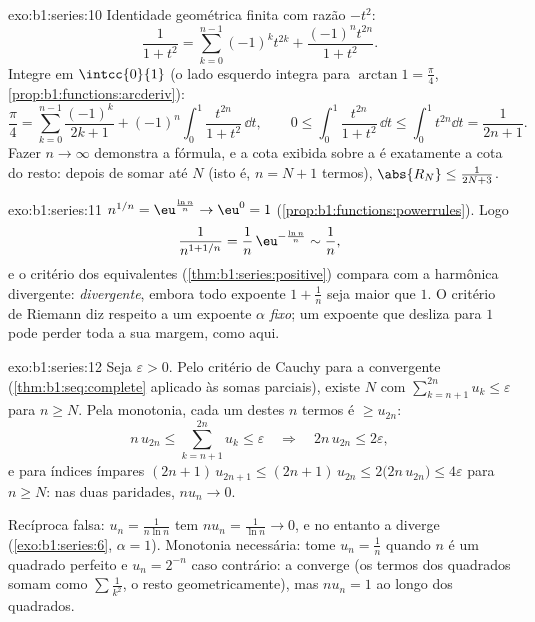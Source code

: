 \begin{solution}{exo:b1:series:10}
Identidade geométrica finita com razão $-t^2$:
\[
\frac{1}{1 + t^2} = \sum_{k=0}^{n-1} (-1)^k t^{2k}
+ \frac{(-1)^n t^{2n}}{1 + t^2} .
\]
Integre em $\intcc{0}{1}$ (o lado esquerdo integra para $\arctan
1 = \frac\pi4$, \cref{prop:b1:functions:arcderiv}):
\[
\frac{\pi}{4} = \sum_{k=0}^{n-1} \frac{(-1)^k}{2k+1}
+ (-1)^n \int_0^1 \frac{t^{2n}}{1+t^2}\,\dd t,
\qquad
0 \leq \int_0^1 \frac{t^{2n}}{1+t^2}\,\dd t \leq \int_0^1 t^{2n}\dd
t = \frac{1}{2n+1} .
\]
Fazer $n \to \infty$ demonstra a fórmula, e a cota exibida sobre a 
é exatamente a cota do resto: depois de somar até
$N$ (isto é, $n = N + 1$ termos), $\abs{R_N} \leq \frac{1}{2N + 3}$.
\end{solution}

\begin{solution}{exo:b1:series:11}
$n^{1/n} = \eu^{\frac{\ln n}{n}} \to \eu^0 = 1$
(\cref{prop:b1:functions:powerrules}). Logo
\[
\frac{1}{n^{1 + 1/n}} = \frac{1}{n}\,\eu^{-\frac{\ln n}{n}}
\sim \frac{1}{n} ,
\]
e o critério dos equivalentes (\cref{thm:b1:series:positive})
compara com a  harmônica divergente: \emph{divergente},
embora todo expoente $1 + \frac1n$ seja maior que $1$. O critério de
Riemann diz respeito a um expoente $\alpha$ \emph{fixo}; um expoente
que desliza para $1$ pode perder toda a sua margem, como aqui.
\end{solution}

\begin{solution}{exo:b1:series:12}
Seja $\varepsilon > 0$. Pelo critério de Cauchy para a
 convergente (\cref{thm:b1:seq:complete} aplicado às
somas parciais), existe $N$ com $\sum_{k=n+1}^{2n} u_k \leq
\varepsilon$ para $n \geq N$. Pela monotonia,
cada um destes $n$ termos é $\geq u_{2n}$:
\[
n\,u_{2n} \leq \sum_{k=n+1}^{2n} u_k \leq \varepsilon
\quad\Longrightarrow\quad 2n\,u_{2n} \leq 2\varepsilon ,
\]
e para índices ímpares $(2n+1)\,u_{2n+1} \leq (2n+1)\,u_{2n} \leq
2\bigl(2n\,u_{2n}\bigr) \leq 4\varepsilon$ para $n \geq N$: nas duas
paridades, $n u_n \to 0$.

Recíproca falsa: $u_n = \frac{1}{n\ln n}$ tem $n u_n =
\frac{1}{\ln n} \to 0$, e no entanto a  diverge
(\cref{exo:b1:series:6}, $\alpha = 1$). Monotonia necessária:
tome $u_n = \frac1n$ quando $n$ é um quadrado perfeito e $u_n =
2^{-n}$ caso
contrário: a  converge (os termos dos quadrados somam
como $\sum \frac{1}{k^2}$, o resto geometricamente), mas $n u_n =
1$ ao longo dos
quadrados.
\end{solution}


